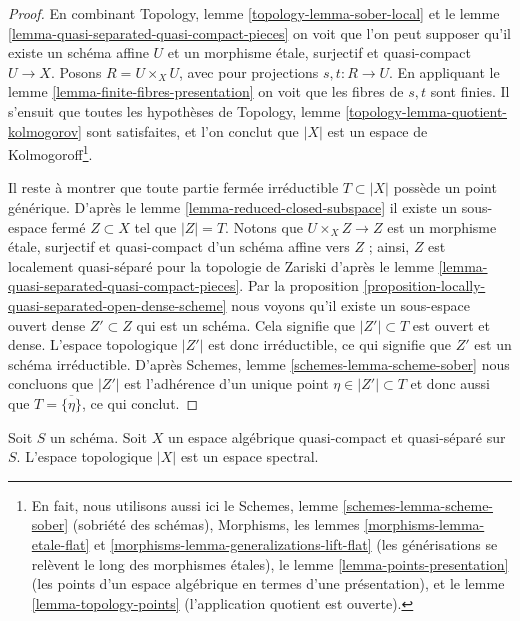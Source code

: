 \begin{proof}
En combinant
Topology, lemme \ref{topology-lemma-sober-local}
et le
lemme \ref{lemma-quasi-separated-quasi-compact-pieces}
on voit que l'on peut supposer qu'il existe un schéma affine $U$
et un morphisme \'etale, surjectif et quasi-compact $U \to X$.
Posons $R = U \times_X U$, avec pour projections $s, t : R \to U$. En appliquant le
lemme \ref{lemma-finite-fibres-presentation}
on voit que les fibres de $s, t$ sont finies. Il s'ensuit que toutes les hypothèses de
Topology, lemme \ref{topology-lemma-quotient-kolmogorov}
sont satisfaites, et l'on conclut que $|X|$ est un espace de Kolmogoroff\footnote{
En fait, nous utilisons aussi ici le
Schemes, lemme \ref{schemes-lemma-scheme-sober} (sobriété des schémas),
Morphisms, les lemmes \ref{morphisms-lemma-etale-flat}
et \ref{morphisms-lemma-generalizations-lift-flat} (les générisations
se relèvent le long des morphismes \'etales), le
lemme \ref{lemma-points-presentation} (les points d'un espace algébrique en
termes d'une présentation), et le
lemme \ref{lemma-topology-points} (l'application quotient est ouverte).}.

\medskip\noindent
Il reste à montrer que toute partie fermée irréductible
$T \subset |X|$ possède un point générique. D'après le
lemme \ref{lemma-reduced-closed-subspace}
il existe un sous-espace fermé $Z \subset X$ tel que $|Z| = T$.
Notons que $U \times_X Z \to Z$ est un morphisme \'etale, surjectif et
quasi-compact d'un schéma affine vers $Z$ ; ainsi, $Z$ est localement
quasi-séparé pour la topologie de Zariski d'après le
lemme \ref{lemma-quasi-separated-quasi-compact-pieces}.
Par la
proposition \ref{proposition-locally-quasi-separated-open-dense-scheme}
nous voyons qu'il existe un sous-espace ouvert dense $Z' \subset Z$
qui est un schéma. Cela signifie que $|Z'| \subset T$ est ouvert et dense.
L'espace topologique $|Z'|$ est donc irréductible, ce qui signifie que
$Z'$ est un schéma irréductible. D'après
Schemes, lemme \ref{schemes-lemma-scheme-sober}
nous concluons que $|Z'|$ est l'adhérence d'un unique point
$\eta \in |Z'| \subset T$ et donc aussi que $T = \overline{\{\eta\}}$, ce qui conclut.
\end{proof}

\begin{lemma}
\label{lemma-quasi-compact-quasi-separated-spectral}
Soit $S$ un schéma. Soit $X$ un espace algébrique quasi-compact et
quasi-séparé sur $S$. L'espace topologique $|X|$ est un espace spectral.
\end{lemma}


